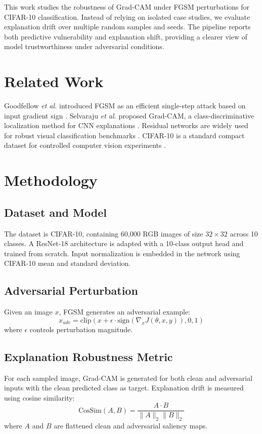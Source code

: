 \documentclass[conference]{IEEEtran}
\begin{document}
This work studies the robustness of Grad-CAM under FGSM perturbations for CIFAR-10 classification. Instead of relying on isolated case studies, we evaluate explanation drift over multiple random samples and seeds. The pipeline reports both predictive vulnerability and explanation shift, providing a clearer view of model trustworthiness under adversarial conditions.

\section{Related Work}
Goodfellow \emph{et al.} introduced FGSM as an efficient single-step attack based on input gradient sign \cite{goodfellow2015}. Selvaraju \emph{et al.} proposed Grad-CAM, a class-discriminative localization method for CNN explanations \cite{selvaraju2017}. Residual networks are widely used for robust visual classification benchmarks \cite{he2016}. CIFAR-10 is a standard compact dataset for controlled computer vision experiments \cite{krizhevsky2009}.

\section{Methodology}
\subsection{Dataset and Model}
The dataset is CIFAR-10, containing 60,000 RGB images of size $32\times32$ across 10 classes. A ResNet-18 architecture is adapted with a 10-class output head and trained from scratch. Input normalization is embedded in the network using CIFAR-10 mean and standard deviation.

\subsection{Adversarial Perturbation}
Given an image $x$, FGSM generates an adversarial example:
\begin{equation}
    x_{adv}=\text{clip}\left(x+\epsilon\cdot\text{sign}(\nabla_x J(\theta,x,y)),0,1\right)
\end{equation}
where $\epsilon$ controls perturbation magnitude.

\subsection{Explanation Robustness Metric}
For each sampled image, Grad-CAM is generated for both clean and adversarial inputs with the clean predicted class as target. Explanation drift is measured using cosine similarity:
\begin{equation}
\text{CosSim}(A,B)=\frac{A\cdot B}{\|A\|_2\|B\|_2}
\end{equation}
where $A$ and $B$ are flattened clean and adversarial saliency maps.
\end{document}
